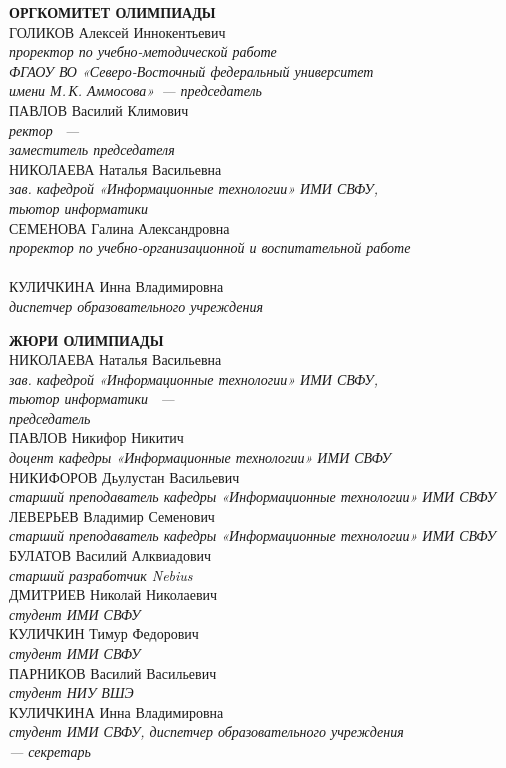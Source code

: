\newpage
\noindent
\textbf{ОРГКОМИТЕТ ОЛИМПИАДЫ}
\\[2mm]
ГОЛИКОВ Алексей Иннокентьевич\\ 
\textit{проректор по учебно-методической работе \\ 
ФГАОУ ВО «Северо-Восточный федеральный университет \\
\textit{имени М.\,К. Аммосова»~--- председатель}}
\\[2mm]
ПАВЛОВ Василий Климович \\
\textit{ректор \man~--- \\
заместитель председателя}
\\[2mm]
НИКОЛАЕВА Наталья Васильевна \\
\textit{зав. кафедрой «Информационные технологии» ИМИ СВФУ, \\
тьютор информатики \man}
\\[2mm]
СЕМЕНОВА Галина Александровна \\
\textit{проректор по учебно-организационной и воспитательной работе \\
\man}
\\[2mm]
КУЛИЧКИНА Инна Владимировна \\
\textit{диспетчер образовательного учреждения \\
\man}

\newpage
\noindent
\textbf{ЖЮРИ ОЛИМПИАДЫ}
\\[2mm]
НИКОЛАЕВА Наталья Васильевна \\
\textit{зав. кафедрой «Информационные технологии» ИМИ СВФУ, \\
тьютор информатики \man~--- \\
председатель}
\\[2mm]
ПАВЛОВ Никифор Никитич \\
\textit{доцент кафедры «Информационные технологии» ИМИ СВФУ}
\\[2mm]
НИКИФОРОВ Дьулустан Васильевич \\
\textit{старший преподаватель кафедры «Информационные технологии» ИМИ СВФУ}
\\[2mm]
ЛЕВЕРЬЕВ Владимир Семенович \\
\textit{старший преподаватель кафедры «Информационные технологии» ИМИ СВФУ}
\\[2mm]
БУЛАТОВ Василий Алквиадович \\
\textit{старший разработчик Nebius}
\\[2mm]
ДМИТРИЕВ Николай Николаевич \\
\textit{студент ИМИ СВФУ}
\\[2mm]
КУЛИЧКИН Тимур Федорович \\
\textit{студент ИМИ СВФУ}
\\[2mm]
ПАРНИКОВ Василий Васильевич \\
\textit{студент НИУ ВШЭ}
\\[2mm]
КУЛИЧКИНА Инна Владимировна \\
\textit{студент ИМИ СВФУ, диспетчер образовательного учреждения \\
\man --- секретарь}
